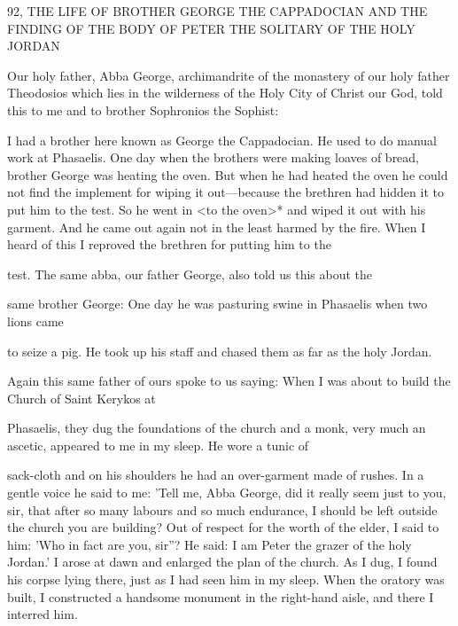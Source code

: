92, THE LIFE OF BROTHER GEORGE
THE CAPPADOCIAN AND THE FINDING OF THE BODY
OF PETER THE SOLITARY OF THE HOLY JORDAN

Our holy father, Abba George, archimandrite of the monastery of
our holy father Theodosios which lies in the wilderness of the Holy
City of Christ our God, told this to me and to brother Sophronios
the Sophist:

I had a brother here known as George the Cappadocian.
He used
to do manual work at Phasaelis.
One day when the brothers were
making loaves of bread, brother George was heating the oven.
But
when he had heated the oven he could not find the implement for
wiping it out—because the brethren had hidden it to put him to the
test.
So he went in <to the oven>* and wiped it out with his
garment.
And he came out again not in the least harmed by the fire.
When I heard of this I reproved the brethren for putting him to the

test.
The same abba, our father George, also told us this about the

same brother George:
One day he was pasturing swine in Phasaelis when two lions came

to seize a pig.
He took up his staff and chased them as far as the
holy Jordan.

Again this same father of ours spoke to us saying:
When I was about to build the Church of Saint Kerykos at

Phasaelis, they dug the foundations of the church and a monk, very
much an ascetic, appeared to me in my sleep.
He wore a tunic of

sack-cloth and on his shoulders he had an over-garment made of
rushes.
In a gentle voice he said to me: 'Tell me, Abba George, did
it really seem just to you, sir, that after so many labours and so
much endurance, I should be left outside the church you are
building? Out of respect for the worth of the elder, I said to him:
'Who in fact are you, sir”? He said: \textquotesingle I am Peter the grazer of the
holy Jordan.' I arose at dawn and enlarged the plan of the church.
As I dug, I found his corpse lying there, just as I had seen him in
my sleep.
When the oratory was built, I constructed a handsome
monument in the right-hand aisle, and there I interred him.

